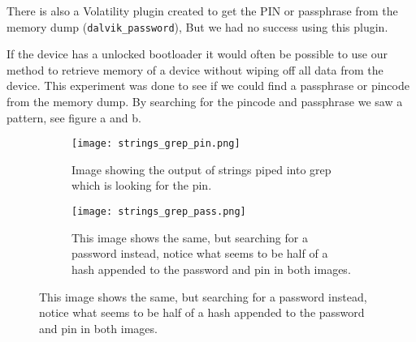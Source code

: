 There is also a Volatility plugin created to get the PIN or passphrase from the
memory dump (\texttt{dalvik\_password}),  %
But we had no success using this plugin.

If the device has a unlocked bootloader it would often be possible to use our 
method to retrieve memory of a device without wiping off all data from the 
device. This experiment was done to see if we could find a passphrase or 
pincode from the memory dump. By searching for the pincode and passphrase we saw a pattern,
see figure a and b. \\


\begin{figure}
        
        \begin{subfigure}[b]{0.3\textwidth}
                \texttt{[image: strings\_grep\_pin.png]}
                \caption{Image showing the output of strings piped into grep
                which is looking for the pin.}
                \label{fig:gull}
        \end{subfigure}%
        \qquad \qquad \qquad \qquad \qquad %
        \begin{subfigure}[b]{0.3\textwidth}
                \texttt{[image: strings\_grep\_pass.png]}
                \caption{This image shows the same, but searching for a
                password instead, notice what seems to be half of a hash appended
            to the password and pin in both images.}
                \label{fig:tiger}
        \end{subfigure}
        \vspace{-20pt}

\end{figure}

